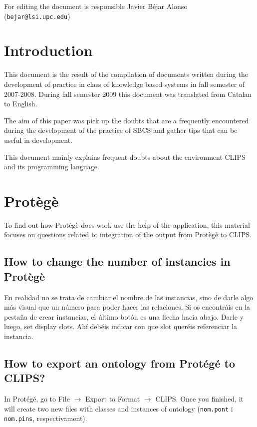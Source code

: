 \documentclass[11pt,svgnames]{scrbook}
\begin{document}
\bigskip
For editing the document is responsible Javier Béjar Alonso
(\texttt{bejar@lsi.upc.edu})

\newpage


\tableofcontents




\chapter{Introduction}

This document is the result of the compilation of documents written
during the development of practice in class of knowledge based systems  
in fall semester of 2007-2008. During fall semester 2009 this document was translated from Catalan to English.

 The aim of this paper was pick up the doubts that are a frequently
encountered during the development of the practice of SBCS and gather tips that can be useful in development.

 This document mainly explains frequent doubts about the environment CLIPS
and its programming language.

\chapter{Protègè}

To find out how Protègè does work use the help of the application, this material focuses on questions related to integration of the output from Protègè to CLIPS.

\section{How to change the number of instancies in Protègè}

En realidad no se trata de cambiar el nombre de las instancias, sino de darle
algo más visual que un número para poder hacer las relaciones.
Si os encontráis en la pestaña de crear instancias, el último botón es una
flecha hacia abajo. Darle y luego, set display slots. Ahí debéis indicar con que
slot queréis referenciar la instancia.

\section{How to export an ontology from Protégé to CLIPS?}

In Protégé, go to File $\rightarrow$ Export to Format $\rightarrow$ CLIPS. Once you finished, it will create two new files with classes and instances of ontology (\texttt{nom.pont} i \texttt{nom.pins}, respectivament).
\end{document}
